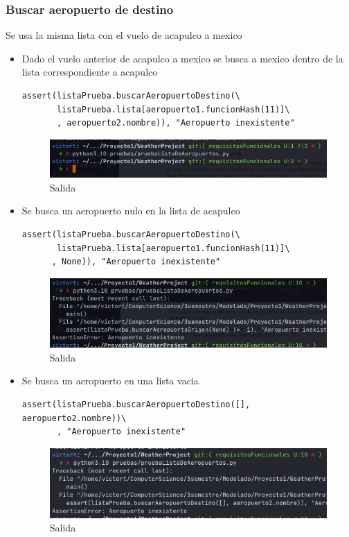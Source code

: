 \documentclass[12pt]{article}
\begin{document}
\subsubsection{Buscar aeropuerto de destino}
Se usa la misma lista con el vuelo de acapulco a mexico
\begin{itemize}
\item Dado el vuelo anterior de acapulco a mexico se busca a mexico dentro de la lista correspondiente a acapulco
\begin{verbatim}
assert(listaPrueba.buscarAeropuertoDestino(\
       listaPrueba.lista[aeropuerto1.funcionHash(11)]\
       , aeropuerto2.nombre)), "Aeropuerto inexistente"
\end{verbatim}
\begin{figure}[h!]
    \centering
    \includegraphics[scale=0.6]{pruebasPy/listaAeropuertos/bien.png}
    \caption{Salida}
  \end{figure}

\item Se busca un aeropuerto nulo en la lista de acapulco
\begin{verbatim}
assert(listaPrueba.buscarAeropuertoDestino(\
       listaPrueba.lista[aeropuerto1.funcionHash(11)]\
      , None)), "Aeropuerto inexistente"
\end{verbatim}
\begin{figure}[h!]
    \centering
    \includegraphics[scale=0.6]{pruebasPy/listaAeropuertos/buscaNone.png}
    \caption{Salida}
  \end{figure}
\item Se busca un aeropuerto en una lista vacia
\begin{verbatim}
assert(listaPrueba.buscarAeropuertoDestino([], aeropuerto2.nombre))\
       , "Aeropuerto inexistente"
\end{verbatim}
\begin{figure}[h!]
    \centering
    \includegraphics[scale=0.6]{pruebasPy/listaAeropuertos/buscaDvacio.png}
    \caption{Salida}
  \end{figure}
\end{itemize}
\end{document}

